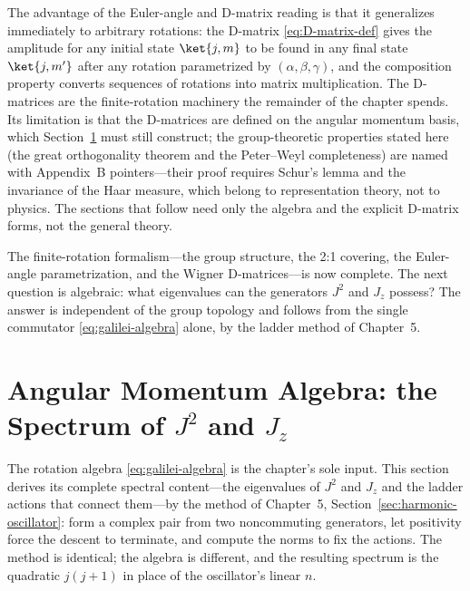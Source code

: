 The advantage of the Euler-angle and D-matrix reading is that it generalizes immediately to arbitrary rotations: the D-matrix \eqref{eq:D-matrix-def} gives the amplitude for any initial state $\ket{j,m}$ to be found in any final state $\ket{j,m'}$ after any rotation parametrized by $(\alpha,\beta,\gamma)$, and the composition property converts sequences of rotations into matrix multiplication. The D-matrices are the finite-rotation machinery the remainder of the chapter spends. Its limitation is that the D-matrices are defined on the angular momentum basis, which Section~\ref{sec:angular-momentum-algebra} must still construct; the group-theoretic properties stated here (the great orthogonality theorem and the Peter--Weyl completeness) are named with Appendix~B pointers---their proof requires Schur's lemma and the invariance of the Haar measure, which belong to representation theory, not to physics. The sections that follow need only the algebra and the explicit D-matrix forms, not the general theory.

The finite-rotation formalism---the group structure, the 2:1 covering, the Euler-angle parametrization, and the Wigner D-matrices---is now complete. The next question is algebraic: what eigenvalues can the generators $J^2$ and $J_z$ possess? The answer is independent of the group topology and follows from the single commutator \eqref{eq:galilei-algebra} alone, by the ladder method of Chapter~5.

\section{Angular Momentum Algebra: the Spectrum of $J^2$ and $J_z$}
\label{sec:angular-momentum-algebra}

The rotation algebra \eqref{eq:galilei-algebra} is the chapter's sole input. This section derives its complete spectral content---the eigenvalues of $J^2$ and $J_z$ and the ladder actions that connect them---by the method of Chapter~5, Section~\ref{sec:harmonic-oscillator}: form a complex pair from two noncommuting generators, let positivity force the descent to terminate, and compute the norms to fix the actions. The method is identical; the algebra is different, and the resulting spectrum is the quadratic $j(j+1)$ in place of the oscillator's linear $n$.

